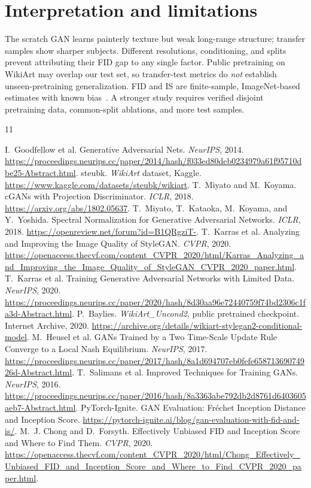 \documentclass{article}
\begin{document}
\section{Interpretation and limitations}
The scratch GAN learns painterly texture but weak long-range structure; transfer samples show sharper subjects. Different resolutions, conditioning, and splits prevent attributing their FID gap to any single factor. Public pretraining on WikiArt may overlap our test set, so transfer-test metrics do \emph{not} establish unseen-pretraining generalization. FID and IS are finite-sample, ImageNet-based estimates with known bias~\cite{chong}. A stronger study requires verified disjoint pretraining data, common-split ablations, and more test samples.

\clearpage
\begin{thebibliography}{11}
\raggedright
{} I.~Goodfellow et al. Generative Adversarial Nets. \emph{NeurIPS}, 2014. \url{https://proceedings.neurips.cc/paper/2014/hash/f033ed80deb0234979a61f95710dbe25-Abstract.html}.
 steubk. \emph{WikiArt} dataset, Kaggle. \url{https://www.kaggle.com/datasets/steubk/wikiart}.
 T.~Miyato and M.~Koyama. cGANs with Projection Discriminator. \emph{ICLR}, 2018. \url{https://arxiv.org/abs/1802.05637}.
 T.~Miyato, T.~Kataoka, M.~Koyama, and Y.~Yoshida. Spectral Normalization for Generative Adversarial Networks. \emph{ICLR}, 2018. \url{https://openreview.net/forum?id=B1QRgziT-}.
 T.~Karras et al. Analyzing and Improving the Image Quality of StyleGAN. \emph{CVPR}, 2020. \url{https://openaccess.thecvf.com/content_CVPR_2020/html/Karras_Analyzing_and_Improving_the_Image_Quality_of_StyleGAN_CVPR_2020_paper.html}.
 T.~Karras et al. Training Generative Adversarial Networks with Limited Data. \emph{NeurIPS}, 2020. \url{https://proceedings.neurips.cc/paper/2020/hash/8d30aa96e72440759f74bd2306c1fa3d-Abstract.html}.
 P.~Baylies. \emph{WikiArt\_Uncond2}, public pretrained checkpoint. Internet Archive, 2020. \url{https://archive.org/details/wikiart-stylegan2-conditional-model}.
 M.~Heusel et al. GANs Trained by a Two Time-Scale Update Rule Converge to a Local Nash Equilibrium. \emph{NeurIPS}, 2017. \url{https://proceedings.neurips.cc/paper/2017/hash/8a1d694707eb0fefe65871369074926d-Abstract.html}.
 T.~Salimans et al. Improved Techniques for Training GANs. \emph{NeurIPS}, 2016. \url{https://proceedings.neurips.cc/paper/2016/hash/8a3363abe792db2d8761d6403605aeb7-Abstract.html}.
 PyTorch-Ignite. GAN Evaluation: Fr\'echet Inception Distance and Inception Score. \url{https://pytorch-ignite.ai/blog/gan-evaluation-with-fid-and-is/}.
 M.~J. Chong and D.~Forsyth. Effectively Unbiased FID and Inception Score and Where to Find Them. \emph{CVPR}, 2020. \url{https://openaccess.thecvf.com/content_CVPR_2020/html/Chong_Effectively_Unbiased_FID_and_Inception_Score_and_Where_to_Find_CVPR_2020_paper.html}.
\end{thebibliography}
\end{document}
